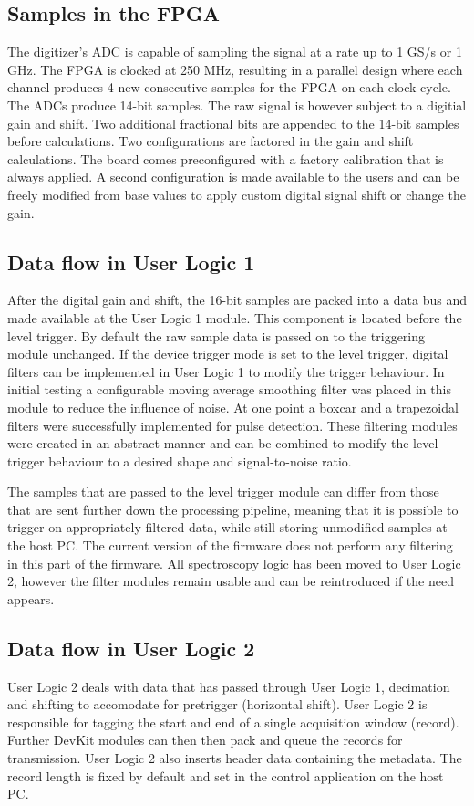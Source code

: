 \documentclass[a4paper,12pt,table]{article}
\begin{document}
	\subsection{Samples in the FPGA}
		The digitizer's ADC is capable of sampling the signal at a rate up to 1 GS/s or 1 GHz.
		The FPGA is clocked at 250 MHz, resulting in a parallel design where each channel produces
		4 new consecutive samples for the FPGA on each clock cycle. The ADCs produce 14-bit samples.
		The raw signal is however subject to a digitial gain and shift.
		Two additional fractional bits are appended to the 14-bit samples before calculations.
		Two configurations are factored in the gain and shift calculations. 
		The board comes preconfigured with a factory calibration that is always applied. 
		A second configuration is made available to
		the users and can be freely modified from base values 
		to apply custom digital signal shift or change the gain.
	\subsection{Data flow in User Logic 1}
		After the digital gain and shift, the 16-bit samples are packed into a data bus 
		and made available at the User Logic 1 module. 
		This component is located before the level trigger. 
		By default the raw sample data is passed on to the triggering module unchanged. 
		If the device trigger mode is set to the level trigger,
		digital filters can be implemented in User Logic 1 to modify the trigger behaviour. 
		In initial testing a configurable moving average smoothing filter was placed in this module 
		to reduce the influence of noise.
		At one point a boxcar and a trapezoidal filters were successfully implemented for pulse detection.
		These filtering modules were created in an abstract manner 
		and can be combined to modify the level trigger
		behaviour to a desired shape and signal-to-noise ratio.
		\par
		The samples that are passed to the level trigger module can differ from those that are sent further
		down the processing pipeline, meaning that it is possible to trigger on appropriately filtered data,
		while still storing unmodified samples at the host PC. The current version of the firmware does not
		perform any filtering in this part of the firmware. All spectroscopy logic has been moved to User Logic 2,
		however the filter modules remain usable and can be reintroduced if the need appears.
	\subsection{Data flow in User Logic 2}\label{ssec:data_flow_in_user_logic_2}
		User Logic 2 deals with data that has passed through User Logic 1, 
		decimation and shifting to accomodate for pretrigger (horizontal shift). 
		User Logic 2 is responsible for tagging the start and end of a single acquisition window (record). 
		Further DevKit modules can then then pack and queue the records for transmission.
		User Logic 2 also inserts header data containing the metadata. 
		The record length is fixed by default and set in the control application on the host PC.
\end{document}
